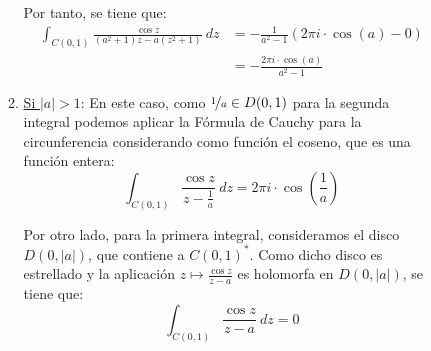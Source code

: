 \begin{ejercicio}
\begin{enumerate}
\begin{description}
\begin{enumerate}
                    Por tanto, se tiene que:
                    \begin{align*}
                        \int_{C(0,1)} \frac{\cos z}{(a^2+1)z - a(z^2+1)}\ dz &= -\frac{1}{a^2-1}\left(2\pi i \cdot \cos(a) - 0\right)\\
                        &= -\frac{2\pi i \cdot \cos(a)}{a^2-1}
                    \end{align*}

                    \item \ul{Si $|a|>1$}: En este caso, como $\nicefrac{1}{a}\in D(0,1)$ para la segunda integral podemos aplicar la Fórmula de Cauchy para la circunferencia considerando como función el coseno, que es una función entera:
                    \begin{equation*}
                        \int_{C(0,1)} \frac{\cos z}{z-\frac{1}{a}}\ dz = 2\pi i \cdot \cos\left(\frac{1}{a}\right)
                    \end{equation*}

                    Por otro lado, para la primera integral, consideramos el disco $D(0,|a|)$, que contiene a $C(0,1)^*$. Como dicho disco es estrellado y la aplicación $z\mapsto \frac{\cos z}{z-a}$ es holomorfa en $D(0,|a|)$, se tiene que:
                    \begin{equation*}
                        \int_{C(0,1)} \frac{\cos z}{z-a}\ dz = 0
                    \end{equation*}


\end{enumerate}
\end{description}
\end{enumerate}
\end{ejercicio}
